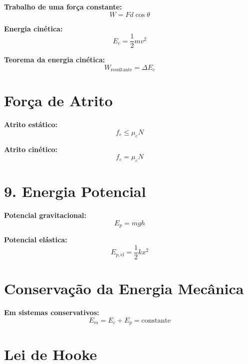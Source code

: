 \documentclass[a4paper,12pt]{article}
\begin{document}
\begin{multicols}{2}
\textbf{Trabalho de uma força constante:}
\begin{equation*}
  W = F d \cos \theta
\end{equation*}

\textbf{Energia cinética:}
\begin{equation*}
  E_c = \frac{1}{2} m v^2
\end{equation*}

\textbf{Teorema da energia cinética:}
\begin{equation*}
  W_{\text{resultante}} = \Delta E_c
\end{equation*}

\section{Força de Atrito}

\textbf{Atrito estático:}
\begin{equation*}
  f_e \leq \mu_e N
\end{equation*}

\textbf{Atrito cinético:}
\begin{equation*}
  f_c = \mu_c N
\end{equation*}

\section{9. Energia Potencial}

\textbf{Potencial gravitacional:}
\begin{equation*}
  E_p = m g h
\end{equation*}

\textbf{Potencial elástica:}
\begin{equation*}
  E_{p,\text{el}} = \frac{1}{2} k x^2
\end{equation*}

\section{Conservação da Energia Mecânica}

\textbf{Em sistemas conservativos:}
\begin{equation*}
  E_m = E_c + E_p = \text{constante}
\end{equation*}

\section{Lei de Hooke}


\end{multicols}
\end{document}
